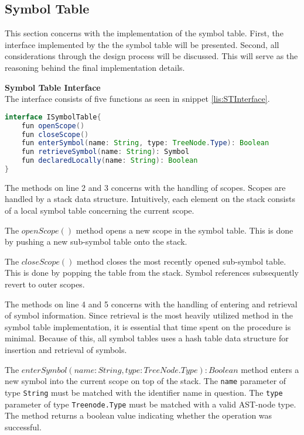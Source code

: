 \subsection{Symbol Table}
This section concerns with the implementation of the symbol table. 
First, the interface implemented by the the symbol table will be presented.
Second, all considerations through the design process will be discussed.
This will serve as the reasoning behind the final implementation details.

\textbf{Symbol Table Interface}\\
The interface consists of five functions as seen in snippet \ref{lis:STInterface}.

\begin{lstlisting}[language=java,label=lis:STInterface,caption=The interface which all symbol table implementations must implement.]
interface ISymbolTable{
	fun openScope()
	fun closeScope()
	fun enterSymbol(name: String, type: TreeNode.Type): Boolean
	fun retrieveSymbol(name: String): Symbol
	fun declaredLocally(name: String): Boolean
}
\end{lstlisting}

The methods on line 2 and 3 concerns with the handling of scopes.
Scopes are handled by a stack data structure.
Intuitively, each element on the stack consists of a local symbol table concerning the current scope.

The $openScope()$ method opens a new scope in the symbol table.
This is done by pushing a new sub-symbol table onto the stack.

The $closeScope()$ method closes the most recently opened sub-symbol table.
This is done by popping the table from the stack.
Symbol references subsequently revert to outer scopes.

The methods on line 4 and 5 concerns with the handling of entering and retrieval of symbol information.
Since retrieval is the most heavily utilized method in the symbol table implementation, it is essential that time spent on the procedure is minimal.
Because of this, all symbol tables uses a hash table data structure for insertion and retrieval of symbols. 

The $enterSymbol(name: String, type: TreeNode.Type): Boolean$ method enters a new symbol into the current scope on top of the stack.
The \texttt{name} parameter of type \texttt{String} must be matched with the identifier name in question.
The \texttt{type} parameter of type \texttt{Treenode.Type} must be matched with a valid AST-node type.
The method returns a boolean value indicating whether the operation was successful.

